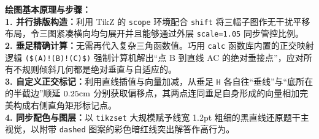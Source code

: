 \documentclass[12pt, a4paper]{ctexrep}
\begin{document}
\vspace{0.6cm}

{\small\color{blue!70!black}
\textbf{绘图基本原理与步骤：}\\
\textbf{1. 并行排版构造：}利用 TikZ 的 \texttt{scope} 环境配合 \texttt{shift} 将三幅子图作无干扰平移布局，令三图紧凑横向均匀展开并且能够通过外层 \texttt{scale=1.05} 同步管控比例。\\
\textbf{2. 垂足精确计算：}无需再代入复杂三角函数值。巧用 \texttt{calc} 函数库内置的正交映射逻辑 \texttt{(\$(A)!(B)!(C)\$)} 强制计算机解出“点 B 到直线 AC 的绝对垂接点”，应对所有不规则倾斜几何都是绝对垂直与自适应的。\\
\textbf{3. 自定义正交标记：}利用直线插值与向量加减，从垂足 \texttt{H} 各自往“垂线”与“底所在的半截边”顺延 $0.25\rm{cm}$ 分别获取偏移点，其两点连同垂足自身形成的向量相加完美构成右侧直角矩形标记点。\\
\textbf{4. 同步配色与图层：}以 \texttt{tikzset} 大规模赋予线宽 1.2pt 粗细的黑直线还原题干主视觉，以附带 \texttt{dashed} 图案的彩色暗红线突出解答作高行为。
}
\end{document}
